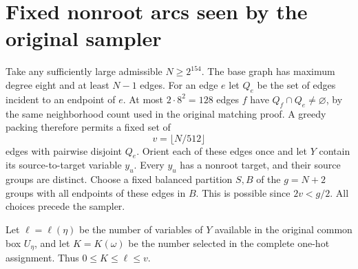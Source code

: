 \documentclass[11pt]{article}
\begin{document}
\section{Fixed nonroot arcs seen by the original sampler}
Take any sufficiently large admissible $N\ge2^{154}$.
The base graph has maximum degree eight and at least $N-1$ edges.
For an edge $e$ let $Q_e$ be the set of edges incident to an
endpoint of $e$. At most $2\cdot8^2=128$ edges $f$ have
$Q_f\cap Q_e\ne\varnothing$, by the same neighborhood count used
in the original matching proof.
A greedy packing therefore permits a fixed set of
\[
                          v=\lfloor N/512\rfloor         \tag{Z6}
\]
edges with pairwise disjoint $Q_e$.
Orient each of these edges once and let $Y$ contain its
source-to-target variable $y_u$. Every $y_u$ has a nonroot target,
and their source groups are distinct.
Choose a fixed balanced partition $S,B$ of the $g=N+2$ groups
with all endpoints of these edges in $B$. This is possible since
$2v<g/2$. All choices precede the sampler.

Let $\ell=\ell(\eta)$ be the number of variables of $Y$ available
in the original common box $U_\eta$, and let $K=K(\omega)$ be the
number selected in the complete one-hot assignment. Thus
$0\le K\le\ell\le v$.
\end{document}
